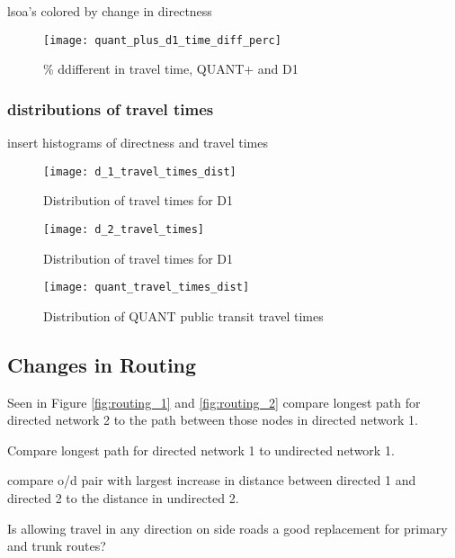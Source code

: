 lsoa's colored by change in directness 

\begin{figure}
\centering
\texttt{[image: quant\_plus\_d1\_time\_diff\_perc]}
\caption{\% ddifferent in travel time, QUANT+ and D1}
\label{fig:quant_d1_time}
\end{figure}


\subsubsection{distributions of travel times}

insert histograms of directness and travel times
\begin{figure}
\centering
\texttt{[image: d\_1\_travel\_times\_dist]}
\caption{Distribution of travel times for D1}
\label{fig:d1_distrib}
\end{figure}

\begin{figure}
\centering
\texttt{[image: d\_2\_travel\_times]}
\caption{Distribution of travel times for D1}
\label{fig:d2_distrib}
\end{figure}

\begin{figure}
\centering
\texttt{[image: quant\_travel\_times\_dist]}
\caption{Distribution of QUANT public transit travel times}
\label{fig:quant_distrib}
\end{figure}


\subsection{Changes in Routing}

Seen in Figure \ref{fig:routing_1} and \ref{fig:routing_2} compare longest path for directed network 2 to the path between those nodes in directed network 1. 

Compare longest path for directed network 1 to undirected network 1. 

compare o/d pair with largest increase in distance between directed 1 and directed 2 to the distance in undirected 2. 

Is allowing travel in any direction on side roads a good replacement for primary and trunk routes?


